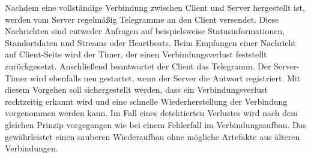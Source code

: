 \documentclass[thesis.tex]{subfiles}
\begin{document}
Nachdem eine vollständige Verbindung zwischen Client und Server hergestellt ist, werden vom Server regelmäßig Telegramme an den Client versendet.
Diese Nachrichten sind entweder Anfragen auf beispielsweise Statusinformationen, Standortdaten und Streams oder Heartbeats.
Beim Empfangen einer Nachricht auf Client-Seite wird der Timer, der einen Verbindungsverlust feststellt zurückgesetzt.
Anschließend beantwortet der Client das Telegramm.
Der Server-Timer wird ebenfalls neu gestartet, wenn der Server die Antwort registriert.
Mit diesem Vorgehen soll sichergestellt werden, dass ein Verbindungsverlust rechtzeitig erkannt wird und eine schnelle Wiederherstellung der Verbindung vorgenommen werden kann.
Im Fall eines detektierten Verlustes wird nach dem gleichen Prinzip vorgegangen wie bei einem Fehlerfall im Verbindungsaufbau.
Das gewährleistet einen sauberen Wiederaufbau ohne mögliche Artefakte aus älteren Verbindungen.
\end{document}
